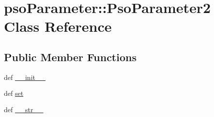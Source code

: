 \hypertarget{classpsoParameter_1_1PsoParameter2}{
\section{psoParameter::PsoParameter2 Class Reference}
\label{classpsoParameter_1_1PsoParameter2}
}
\subsection*{Public Member Functions}
\begin{CompactItemize}
\item 
def \hyperlink{classpsoParameter_1_1PsoParameter2_b8f10c9acd928da1898c60faad7efaff}{\_\-\_\-init\_\-\_\-}
\item 
def \hyperlink{classpsoParameter_1_1PsoParameter2_bf59429bc398c1e3147e2c4685024076}{set}
\item 
def \hyperlink{classpsoParameter_1_1PsoParameter2_2a23d184827809ac8044b243269d37cd}{\_\-\_\-str\_\-\_\-}
\end{CompactItemize}
